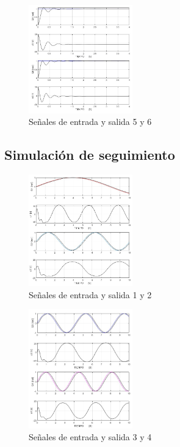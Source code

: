 \documentclass[conference]{IEEEtran}
\begin{document}
\begin{figure} [h]
\centering
\includegraphics[width=0.4\textwidth]{images/normal/q5_q6.jpg}
\caption{Señales de entrada y salida 5 y 6}
\end{figure}



\subsection{Simulación de seguimiento}
\begin{figure} [h]
\centering
\includegraphics[width=0.4\textwidth]{images/seguimiento/q1_q2_seg.jpg}
\caption{Señales de entrada y salida 1 y 2}
\end{figure}


\begin{figure} [h]
\centering
\includegraphics[width=0.4\textwidth]{images/seguimiento/q3_q4_seg.jpg}
\caption{Señales de entrada y salida 3 y 4}
\end{figure}
\end{document}
